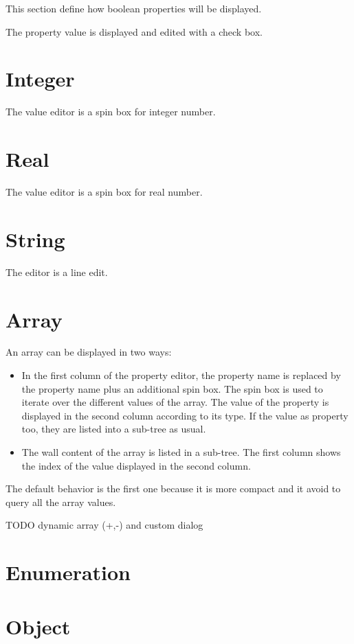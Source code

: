 \documentclass[a4paper, twoside]{report}
\begin{document}
This section define how boolean properties will be displayed.

The property value is displayed and edited with a check box.

\section{Integer}

The value editor is a spin box for integer number.

\section{Real}

The value editor is a spin box for real number.

\section{String}

The editor is a line edit.

\section{Array}

An array can be displayed in two ways:
\begin{itemize}
    \item In the first column of the property editor, the property name is replaced by the property
name plus an additional spin box. The spin box is used to iterate over the different values of the
array. The value of the property is displayed in the second column according to its type. If the
value as property too, they are listed into a sub-tree as usual.
    \item The wall content of the array is listed in a sub-tree. The first column shows the index of
the value displayed in the second column.
\end{itemize}

The default behavior is the first one because it is more compact and it avoid to query all the array
values.

TODO dynamic array (+,-) and custom dialog

\section{Enumeration}
\section{Object}
\end{document}

